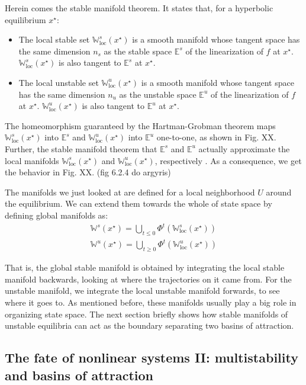 Herein comes the stable manifold theorem. It states that, for a hyperbolic equilibrium $x^\star$:
\begin{itemize}
    \item The local stable set $\mathbb{W}^s_\mathrm{loc}(x^\star)$ is a smooth manifold whose tangent space has the same dimension $n_s$ as the stable space $\mathbb{E}^s$ of the linearization of $f$ at $x^\star$. $\mathbb{W}^s_\mathrm{loc}(x^\star)$ is also tangent to $\mathbb{E}^s$ at $x^\star$.
    \item The local unstable set $\mathbb{W}^u_\mathrm{loc}(x^\star)$ is a smooth manifold whose tangent space has the same dimension $n_u$ as the unstable space $\mathbb{E}^u$ of the linearization of $f$ at $x^\star$. $\mathbb{W}^u_\mathrm{loc}(x^\star)$ is also tangent to $\mathbb{E}^u$ at $x^\star$.
\end{itemize}

The homeomorphism guaranteed by the Hartman-Grobman theorem maps $\mathbb{W}^s_\mathrm{loc}(x^\star)$ into $\mathbb{E}^s$ and $\mathbb{W}^u_\mathrm{loc}(x^\star)$ into $\mathbb{E}^u$ one-to-one, as shown in Fig. XX. Further, the stable manifold theorem that $\mathbb{E}^s$ and $\mathbb{E}^u$ actually approximate the local manifolds $\mathbb{W}^s_\mathrm{loc}(x^\star)$ and $\mathbb{W}^u_\mathrm{loc}(x^\star)$, respectively \cite{argyris}. As a consequence, we get the behavior in Fig. XX. (fig 6.2.4 do argyris)

The manifolds we just looked at are defined for a local neighborhood $U$ around the equilibrium. We can extend them towards the whole of state space by defining global manifolds as:
\begin{align}
    \mathbb{W}^s(x^\star) = \bigcup_{t\leq 0} \Phi^t(\mathbb{W}^s_\mathrm{loc}(x^\star)) \\
    \mathbb{W}^u(x^\star) = \bigcup_{t\geq 0} \Phi^t(\mathbb{W}^u_\mathrm{loc}(x^\star))
\end{align}

That is, the global stable manifold is obtained by integrating the local stable manifold backwards, looking at where the trajectories on it came from. For the unstable manifold, we integrate the local unstable manifold forwards, to see where it goes to. As mentioned before, these manifolds usually play a big role in organizing state space. The next section briefly shows how stable manifolds of unstable equilibria can act as the boundary separating two basins of attraction.

\subsection{The fate of nonlinear systems II: multistability and basins of attraction}


